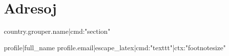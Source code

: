{%
{
  \titleformat{\section}[block]{}{}{0pt}{\centering\huge\textbf}
  \titlespacing{\section}{0pt}{4em}{1em}
  \titleformat{\subsection}[block]{}{}{0pt}{\large\textbf}
  \titlespacing{\subsection}{0pt}{2em}{1em}
  \titleformat{\subsubsection}[block]{}{}{0pt}{\small\textbf}
  \titlespacing{\subsubsection}{0pt}{0pt}{0pt}
  \relax  %

  {%
    \thispagestyle{empty}
    \part*{Adresoj}
  {%

  {%

  {%
    {{ country.grouper.name|cmd:"section" }}
      \vspace{.6em}\nopagebreak
      {%
        {%
            {\small
            {\semibold
                {%
            }\nopagebreak
            {%
                {{ profile|full_name }}
                {{ profile.email|escape_latex|cmd:"texttt"|ctx:"footnotesize" }}
            {%
            }
        \vspace{.7em}
        {%
      {%

}}}}}}}}}}}}}
